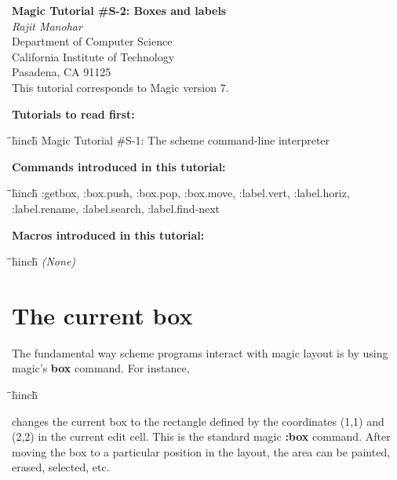 \documentclass[letterpaper,twoside,12pt]{article}
\def\hinch{\hspace*{0.5in}}
\def\starti{\begin{center}\begin{tabbing}\hinch\=\hinch\=\hinch\=hinch\=\hinch\=\kill}
\def\endi{\end{tabbing}\end{center}}
\def\ii{\>\>\>}
\def\mytitle{Magic Tutorial \#S-2: Boxes and labels}
\begin{document}
\makeatletter
\newcommand{\ps@magic}{%
	\renewcommand{\@oddhead}{\mytitle\hfil\today}%
	\renewcommand{\@evenhead}{\today\hfil\mytitle}%
	\renewcommand{\@evenfoot}{\hfil\textrm{--{\thepage}--}\hfil}%
	\renewcommand{\@oddfoot}{\@evenfoot}}
\newcommand{\ps@mplain}{%
	\renewcommand{\@oddhead}{}%
	\renewcommand{\@evenhead}{}%
	\renewcommand{\@evenfoot}{\hfil\textrm{--{\thepage}--}\hfil}%
	\renewcommand{\@oddfoot}{\@evenfoot}}
\makeatother
\pagestyle{magic}
\thispagestyle{mplain}


\begin{center}
  {\bfseries \Large \mytitle} \\
  \vspace*{0.5in}
  {\itshape Rajit Manohar} \\
  \vspace*{0.5in}
   Department of Computer Science \\
   California Institute of Technology \\
   Pasadena, CA  91125 \\
  \vspace*{0.25in}
  This tutorial corresponds to Magic version 7. \\
\end{center}
\vspace*{0.5in}

{\noindent\bfseries\large Tutorials to read first:}
\starti
   \> Magic Tutorial \#S-1: The scheme command-line interpreter
\endi

{\noindent\bfseries\large Commands introduced in this tutorial:}
\starti
   \> :getbox, :box.push, :box.pop, :box.move, :label.vert, :label.horiz, \\
   \> :label.rename, :label.search, :label.find-next
\endi

{\noindent\bfseries\large Macros introduced in this tutorial:}

\starti
   \> {\itshape (None)}
\endi

\vspace*{0.25in}
\section{The current box}

The fundamental way scheme programs interact with magic layout is by
using magic's {\bfseries box} command. For instance,

\starti
   \ii {\bfseries (box 1 1 2 2)}
\endi

changes the current box to the rectangle defined by the coordinates
(1,1) and (2,2) in the current edit cell. This is the standard magic
{\bfseries :box} command. After moving the box to a particular position in
the layout, the area can be painted, erased, selected, etc.
\end{document}
